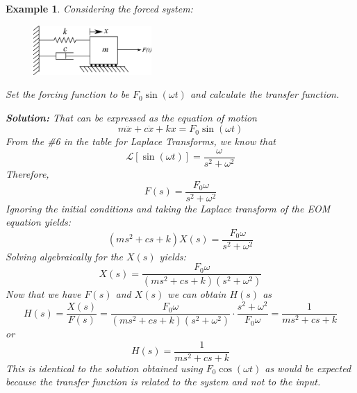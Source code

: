 \documentclass[12pt,letter]{article}
\newtheorem{ex}{Example}
\numberwithin{ex}{section} %
\newenvironment{example}{\begin{mdframed}[middlelinewidth=0.5mm]\begin{ex}\normalfont}{\end{ex}\end{mdframed}}
\numberwithin{re}{section} %
\newcommand{\Laplace}[1]{\ensuremath{\mathcal{L}{\left[#1\right]}}}
\begin{document}
\begin{example}

Considering the forced system:
\begin{figure}[H]
	\centering
	\includegraphics[width=0.4\textwidth]{../Figures/forced_spring_mass_damper_system.png}
\end{figure}
Set the forcing function to be $F_0 \sin(\omega t)$ and calculate the transfer function. 

\noindent\textbf{Solution:} That can be expressed as the equation of motion
\begin{equation}
	m\ddot{x} + c\dot{x} +kx = F_0 \sin(\omega t)
\end{equation}
From the \#6 in the table for Laplace Transforms, we know that
\begin{equation}
	\Laplace{\sin(\omega t)} = \frac{\omega}{s^2+\omega^2}
\end{equation}
Therefore, 
\begin{equation}
F(s) = \frac{F_0\omega}{s^2+\omega^2}
\end{equation}
Ignoring the initial conditions and taking the Laplace transform of the EOM equation yields:
\begin{equation}
(ms^2 + cs +k)X(s) = \frac{F_0 \omega}{s^2+\omega^2} 
\end{equation}
Solving algebraically for the $X(s)$ yields: 
\begin{equation}
X(s) = \frac{F_0\omega}{(ms^2 + cs +k)(s^2+\omega^2)}
\end{equation}
Now that we have $F(s)$ and $X(s)$ we can obtain $H(s)$ as  
\begin{equation}
H(s) = \frac{X(s)}{F(s)} = \frac{F_0 \omega }{(ms^2 + cs +k)(s^2+\omega^2)} \cdot \frac{s^2+\omega^2}{F_0 \omega} = \frac{1}{ms^2+cs+k}
\end{equation}
or 
\begin{equation}
H(s) = \frac{1}{ms^2+cs+k}
\end{equation}
This is identical to the solution obtained using $F_0 \cos(\omega t)$ as would be expected because the transfer function is related to the system and not to the input. 
\end{example}  
\end{document}
